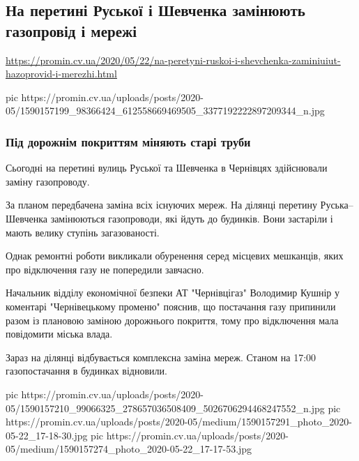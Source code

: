  
 

\subsection{На перетині Руської і Шевченка замінюють газопровід і мережі}

\url{https://promin.cv.ua/2020/05/22/na-peretyni-ruskoi-i-shevchenka-zaminiuiut-hazoprovid-i-merezhi.html}

\ifcmt
pic https://promin.cv.ua/uploads/posts/2020-05/1590157199_98366424_612558669469505_3377192222897209344_n.jpg
\fi

\subsubsection{Під дорожнім покриттям міняють старі труби}

Сьогодні на перетині вулиць Руської та Шевченка в Чернівцях здійснювали заміну
газопроводу.
 
За планом передбачена заміна всіх існуючих мереж. На ділянці перетину
Руська–Шевченка замінюються газопроводи, які йдуть до будинків. Вони застаріли
і мають велику ступінь загазованості.
 
Однак ремонтні роботи викликали обуренення серед місцевих мешканців, яких про
відключення газу не попередили завчасно.
 
Начальник відділу економічної безпеки АТ "Чернівцігаз" Володимир Кушнір у
коментарі "Чернівецькому променю" пояснив, що постачання газу припинили разом
із плановою заміною дорожнього покриття, тому про відключення мала повідомити
міська влада.
 
Зараз на ділянці відбувається комплексна заміна мереж. Станом на 17:00
газопостачання в будинках відновили.

\ifcmt
pic https://promin.cv.ua/uploads/posts/2020-05/1590157210_99066325_278657036508409_5026706294468247552_n.jpg
pic https://promin.cv.ua/uploads/posts/2020-05/medium/1590157291_photo_2020-05-22_17-18-30.jpg
pic https://promin.cv.ua/uploads/posts/2020-05/medium/1590157274_photo_2020-05-22_17-17-53.jpg
\fi
